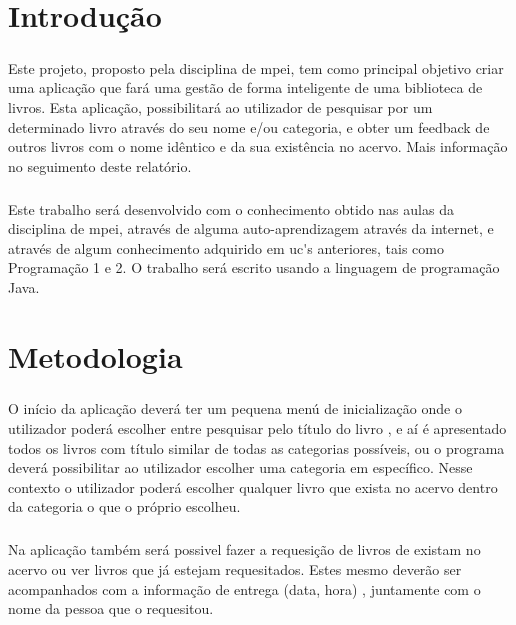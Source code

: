 \documentclass{report}
\begin{document}
\chapter{Introdução}
\label{chap.introducao}
\paragraph{} 
Este projeto, proposto pela disciplina de \acs{mpei}, tem como principal objetivo criar uma aplicação que fará uma gestão de forma inteligente de uma biblioteca de livros. Esta aplicação, possibilitará ao utilizador de pesquisar por um determinado livro através do seu nome e/ou categoria, e obter um feedback de outros livros com o nome idêntico e da sua existência no acervo. Mais informação no seguimento deste relatório.
\paragraph{}
Este trabalho será desenvolvido com o conhecimento obtido nas aulas da disciplina de \acs{mpei}, através de alguma auto-aprendizagem através da internet, e através de algum conhecimento adquirido em \acs{uc's} anteriores, tais como Programação 1 e 2. O trabalho será escrito usando a linguagem de programação Java.

\chapter{Metodologia}
\label{chap.metodologia}
\paragraph{}
O início da aplicação deverá ter um pequena menú de inicialização onde o utilizador poderá escolher entre pesquisar pelo título do livro , e aí é apresentado todos os livros com título similar de todas as categorias possíveis, ou o programa deverá possibilitar ao utilizador escolher uma categoria em específico. Nesse contexto o utilizador poderá escolher qualquer livro que exista no acervo dentro da categoria o que o próprio escolheu.
\paragraph{}
Na aplicação também será possivel fazer a requesição de livros de existam no acervo ou ver livros que já estejam requesitados. Estes mesmo deverão ser acompanhados com a informação de entrega (data, hora) , juntamente com o nome da pessoa que o requesitou.
\end{document}

